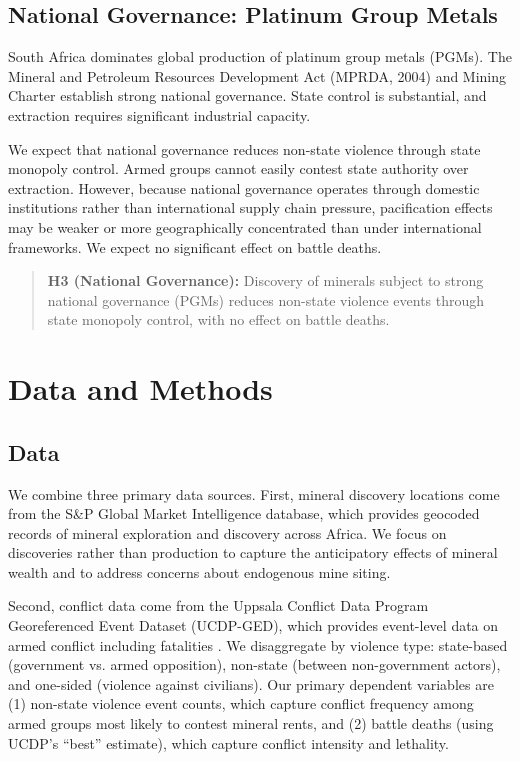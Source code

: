 \documentclass[11pt]{article}
\begin{document}
\subsection{National Governance: Platinum Group Metals}

South Africa dominates global production of platinum group metals (PGMs). The Mineral and Petroleum Resources Development Act (MPRDA, 2004) and Mining Charter establish strong national governance. State control is substantial, and extraction requires significant industrial capacity.

We expect that national governance reduces non-state violence through state monopoly control. Armed groups cannot easily contest state authority over extraction. However, because national governance operates through domestic institutions rather than international supply chain pressure, pacification effects may be weaker or more geographically concentrated than under international frameworks. We expect no significant effect on battle deaths.


\begin{quote}
\textbf{H3 (National Governance):} Discovery of minerals subject to strong national governance (PGMs) reduces non-state violence events through state monopoly control, with no effect on battle deaths.
\end{quote}

\section{Data and Methods}

\subsection{Data}

We combine three primary data sources. First, mineral discovery locations come from the S\&P Global Market Intelligence database, which provides geocoded records of mineral exploration and discovery across Africa. We focus on discoveries rather than production to capture the anticipatory effects of mineral wealth and to address concerns about endogenous mine siting.

Second, conflict data come from the Uppsala Conflict Data Program Georeferenced Event Dataset (UCDP-GED), which provides event-level data on armed conflict including fatalities \citep{sundberg2013ucdp, pettersson2021organized}. We disaggregate by violence type: state-based (government vs. armed opposition), non-state (between non-government actors), and one-sided (violence against civilians). Our primary dependent variables are (1) non-state violence event counts, which capture conflict frequency among armed groups most likely to contest mineral rents, and (2) battle deaths (using UCDP's ``best'' estimate), which capture conflict intensity and lethality.
\end{document}
